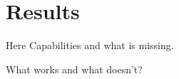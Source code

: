 \section{Results}\label{sec:Results}
Here Capabilities and what is missing.

What works and what doesn't?
